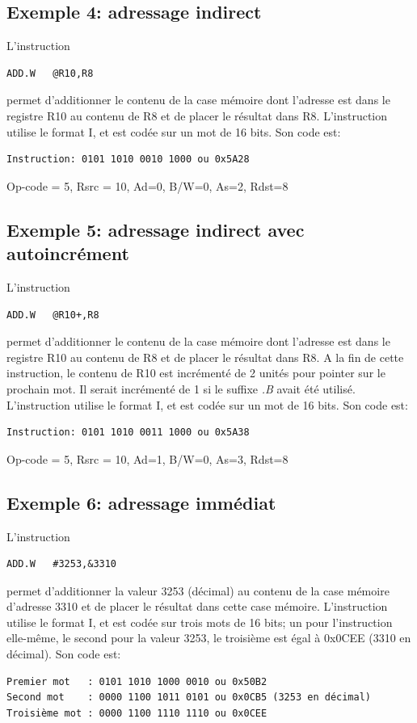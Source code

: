 \subsection{Exemple 4: adressage indirect}
L'instruction
\lstset{style=customc}
\begin{lstlisting}
ADD.W   @R10,R8
\end{lstlisting}
permet d'additionner le contenu de la case mémoire dont l'adresse est dans le registre R10 au contenu de R8 et de placer le résultat dans R8.
L'instruction utilise le format I, et est codée sur un mot de 16 bits.
Son code est:
\lstset{style=customc}
\begin{lstlisting}
Instruction: 0101 1010 0010 1000 ou 0x5A28
\end{lstlisting}

Op-code = 5, Rsrc = 10, Ad=0, B/W=0, As=2, Rdst=8

\subsection{Exemple 5: adressage indirect avec autoincrément}
L'instruction
\lstset{style=customc}
\begin{lstlisting}
ADD.W   @R10+,R8
\end{lstlisting}
permet d'additionner le contenu de la case mémoire dont l'adresse est dans le registre R10 au contenu de R8 et de placer le résultat dans R8. A la fin de cette instruction, le contenu de R10 est incrémenté de 2 unités pour pointer sur le prochain mot. Il serait incrémenté de 1 si le suffixe \textit{.B} avait été utilisé.
L'instruction utilise le format I, et est codée sur un mot de 16 bits.
Son code est:
\lstset{style=customc}
\begin{lstlisting}
Instruction: 0101 1010 0011 1000 ou 0x5A38
\end{lstlisting}

Op-code = 5, Rsrc = 10, Ad=1, B/W=0, As=3, Rdst=8

\subsection{Exemple 6: adressage immédiat}
L'instruction
\lstset{style=customc}
\begin{lstlisting}
ADD.W   #3253,&3310
\end{lstlisting}
permet d'additionner la valeur 3253 (décimal) au contenu de la case mémoire d'adresse 3310 et de placer le résultat dans cette case mémoire.
L'instruction utilise le format I, et est codée sur trois mots de 16 bits; un pour l'instruction elle-même, le second pour la valeur 3253, le troisième est égal à 0x0CEE (3310 en décimal).
Son code est:
\lstset{style=customc}
\begin{lstlisting}
Premier mot   : 0101 1010 1000 0010	ou 0x50B2
Second mot    : 0000 1100 1011 0101 ou 0x0CB5 (3253 en décimal)
Troisième mot : 0000 1100 1110 1110 ou 0x0CEE
\end{lstlisting}

